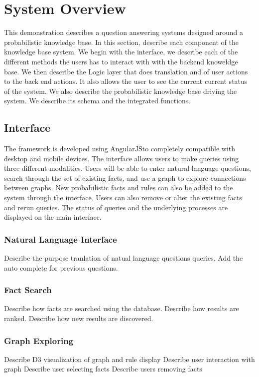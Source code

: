 
\section{System Overview}

This demonstration describes a question answering systems designed around
a probabilistic knowledge base.
In this section, describe each component of the knowledge base system.
We begin with the interface, we describe each of the different methods
the users has to interact with with the backend knoweldge base.
We then describe the Logic layer that does translation and of user actions
to the back end actions. It also allows the user to see the current current
status of the system.
We also describe the probabilistic knowledge base driving the system.
We describe its schema and the integrated functions.



\subsection{Interface}

The framework is developed using AngularJS\@ to completely compatible with desktop and mobile devices.
The interface allows users to make queries using three different modalities.
Users will be able to enter natural language questions, search through the set of existing facts, and use a graph to explore connections between graphs.
New probabilistic facts and rules can also be added to the system through the interface.
Users can also remove or alter the existing facts and rerun queries.
The status of queries and the underlying processes are displayed on the main interface.


\subsubsection{Natural Language Interface}
Describe the purpose tranlation of natual language questions queries.
Add the auto complete for previous questions.
\subsubsection{Fact Search}
Describe how facts are searched using the database.
Describe how results are ranked.
Describe how new results are discovered.
\subsubsection{Graph Exploring}
Describe D3 visualization of graph and rule display
Describe user interaction with graph
Describe user selecting facts
Describe users removing facts


